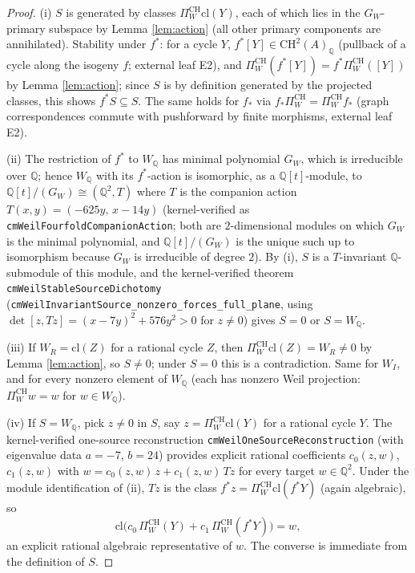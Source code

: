 \documentclass[11pt]{article}
\begin{document}
\begin{proof}
(i) $S$ is generated by classes $\Pi_W^{\mathrm{CH}}\mathrm{cl}(Y)$, each of which lies in the $G_W$-primary
subspace by Lemma \ref{lem:action} (all other primary components are annihilated). Stability under $f^{*}$:
for a cycle $Y$, $f^{*}[Y]\in\mathrm{CH}^{2}(A)_{\mathbb{Q}}$ (pullback of a cycle along the isogeny $f$; external
leaf E2), and $\Pi_W^{\mathrm{CH}}(f^{*}[Y])=f^{*}\Pi_W^{\mathrm{CH}}([Y])$ by Lemma \ref{lem:action}; since $S$ is
by definition generated by the projected classes, this shows $f^{*}S\subseteq S$. The same holds for $f_{*}$ via
$f_{*}\Pi_W^{\mathrm{CH}}=\Pi_W^{\mathrm{CH}}f_{*}$ (graph correspondences commute with pushforward by
finite morphisms, external leaf E2).

(ii) The restriction of $f^{*}$ to $W_{\mathbb{Q}}$ has minimal polynomial $G_W$, which is irreducible over
$\mathbb{Q}$; hence $W_{\mathbb{Q}}$ with its $f^{*}$-action is isomorphic, as a
$\mathbb{Q}[t]$-module, to $\mathbb{Q}[t]/(G_W)\cong(\mathbb{Q}^2,T)$ where $T$ is the companion action
$T(x,y)=(-625y,\,x-14y)$ (kernel-verified as \texttt{cmWeilFourfoldCompanionAction}; both are $2$-dimensional
modules on which $G_W$ is the minimal polynomial, and $\mathbb{Q}[t]/(G_W)$ is the unique such up to isomorphism
because $G_W$ is irreducible of degree $2$). By (i), $S$ is a $T$-invariant $\mathbb{Q}$-submodule of this module,
and the kernel-verified theorem \texttt{cmWeilStableSourceDichotomy} (\texttt{cmWeilInvariantSource\_nonzero\_forces\_full\_plane},
using $\det[z,Tz]=(x-7y)^2+576y^2>0$ for $z\ne0$) gives $S=0$ or $S=W_{\mathbb{Q}}$.

(iii) If $W_R=\mathrm{cl}(Z)$ for a rational cycle $Z$, then $\Pi_W^{\mathrm{CH}}\mathrm{cl}(Z)=W_R\ne0$ by
Lemma \ref{lem:action}, so $S\ne0$; under $S=0$ this is a contradiction. Same for $W_I$, and for every nonzero
element of $W_{\mathbb{Q}}$ (each has nonzero Weil projection: $\Pi_W^{\mathrm{CH}}w=w$ for $w\in W_{\mathbb{Q}}$).

(iv) If $S=W_{\mathbb{Q}}$, pick $z\ne0$ in $S$, say $z=\Pi_W^{\mathrm{CH}}\mathrm{cl}(Y)$ for a rational cycle
$Y$. The kernel-verified one-source reconstruction \texttt{cmWeilOneSourceReconstruction} (with eigenvalue data
$a=-7$, $b=24$) provides explicit rational coefficients $c_0(z,w)$, $c_1(z,w)$ with
$w=c_0(z,w)\,z+c_1(z,w)\,Tz$ for every target $w\in\mathbb{Q}^2$. Under the module identification of (ii), $Tz$
is the class $f^{*}z=\Pi_W^{\mathrm{CH}}\mathrm{cl}(f^{*}Y)$ (again algebraic), so
\[
\mathrm{cl}\big(c_0\,\Pi_W^{\mathrm{CH}}(Y)+c_1\,\Pi_W^{\mathrm{CH}}(f^{*}Y)\big)=w,
\]
an explicit rational algebraic representative of $w$. The converse is immediate from the definition of $S$.


\end{proof}
\end{document}

